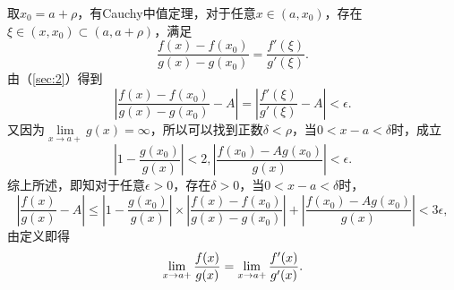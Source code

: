 \documentclass{ctexart}
\begin{document}
          取$x_{0}=a+\rho$，有Cauchy中值定理，对于任意$x \in (a,x_{0})$，存在$\xi \in (x,x_{0}) \subset (a,a+\rho)$，满足
          \begin{equation}
          \frac{f(x)-f(x_{0})}{g(x)-g(x_{0})}=\frac{f'(\xi)}{g'(\xi)}.\label{sec:2}
          \end{equation}
          由（\ref{sec:2}）得到
          \begin{equation}
          |\frac{f(x)-f(x_{0})}{g(x)-g(x_{0})}-A|=|\frac{f'(\xi)}{g'(\xi)}-A|<\epsilon.
          \end{equation}
          又因为$\lim\limits_{x \to a+}g(x)=\infty$，所以可以找到正数$\delta<\rho$，当$0<x-a<\delta$时，成立
          \begin{equation}
          |1-\frac{g(x_{0})}{g(x)}|<2,|\frac{f(x_{0})-Ag(x_{0})}{g(x)}|<\epsilon.
          \end{equation}
          综上所述，即知对于任意$\epsilon>0$，存在$\delta>0$，当$0<x-a<\delta$时，
          \begin{equation}
          |\frac{f(x)}{g(x)}-A|\le|1-\frac{g(x_{0})}{g(x)}|\times|\frac{f(x)-f(x_{0})}{g(x)-g(x_{0})}|+|\frac{f(x_{0})-Ag(x_{0})}{g(x)}|<3\epsilon,
          \end{equation}
          由定义即得
           \begin{equation}
           \lim_{x \to a+}\frac{f(x)}{g(x)}=\lim_{x \to a+}\frac{f'(x)}{g'(x)}\notag.
           \end{equation}
\end{document}

